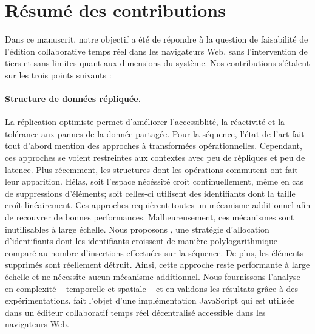 
\section{Résumé des contributions}
\label{conclu:sec:summary}


Dans ce manuscrit, notre objectif a été de répondre à la question de faisabilité
de l'édition collaborative temps réel dans les navigateurs Web, sans
l'intervention de tiers et sans limites quant aux dimensions du système. Nos
contributions s'étalent sur les trois points suivants :

\paragraph{Structure de données répliquée.} La réplication optimiste permet
d'améliorer l'accessiblité, la réactivité et la tolérance aux pannes de la
donnée partagée. Pour la séquence, l'état de l'art fait tout d'abord mention des
approches à transformées opérationnelles. Cependant, ces approches se voient
restreintes aux contextes avec peu de répliques et peu de latence. Plus
récemment, les structures dont les opérations commutent ont fait leur
apparition. Hélas, soit l'espace nécéssité croît continuellement, même en cas de
suppressions d'éléments; soit celles-ci utilisent des identifiants dont la
taille croît linéairement. Ces approches requièrent toutes un mécanisme
additionnel afin de recouvrer de bonnes performances. Malheureusement, ces
mécanismes sont inutilisables à large échelle. Nous proposons \LSEQ, une
stratégie d'allocation d'identifiants dont les identifiants croissent de manière
polylogarithmique comparé au nombre d'insertions effectuées sur la séquence. De
plus, les éléments supprimés sont réellement détruit. Ainsi, cette approche
reste performante à large échelle et ne nécessite aucun mécanisme additionnel.
Nous fournissons l'analyse en complexité -- temporelle et spatiale -- et en
validons les résultats grâce à des expérimentations. \LSEQ fait l'objet d'une
implémentation JavaScript qui est utilisée dans un éditeur collaboratif temps
réel décentralisé accessible dans les navigateurs Web.

